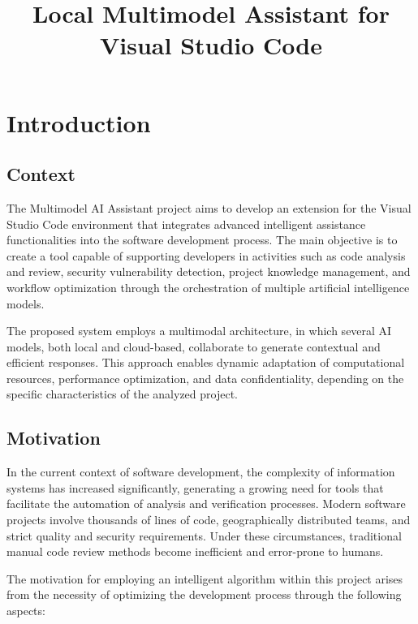 \documentclass[12pt,a4paper]{article}
\title{\textbf{Local Multimodel Assistant for Visual Studio Code}}
\date{}
\begin{document}
\maketitle

\section{Introduction}

\subsection{Context}

The Multimodel AI Assistant project aims to develop an extension for the Visual Studio Code environment that integrates 
advanced intelligent assistance functionalities into the software development process. The main objective is to create a 
tool capable of supporting developers in activities such as code analysis and review, security vulnerability detection, 
project knowledge management, and workflow optimization through the orchestration of multiple artificial intelligence 
models.

The proposed system employs a multimodal architecture, in which several AI models, both local and cloud-based, 
collaborate to generate contextual and efficient responses. This approach enables dynamic adaptation of computational 
resources, performance optimization, and data confidentiality, depending on the specific characteristics of the analyzed 
project.

\subsection{Motivation}

In the current context of software development, the complexity of information systems has increased significantly, 
generating a growing need for tools that facilitate the automation of analysis and verification processes. Modern 
software projects involve thousands of lines of code, geographically distributed teams, and strict quality and security 
requirements. Under these circumstances, traditional manual code review methods become inefficient and error-prone to 
humans.

The motivation for employing an intelligent algorithm within this project arises from the necessity of optimizing the 
development process through the following aspects:
\end{document}
